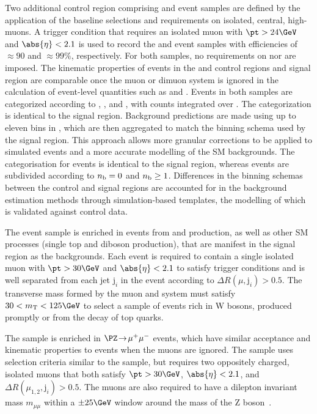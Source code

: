Two additional control region comprising \mj and \mmj event samples
are defined by the application of the baseline selections and
requirements on isolated, central, high-\pt muons. A trigger condition
that requires an isolated muon with $\pt > 24\GeV$ and $\abs{\eta} <
2.1$ is used to record the \mj and \mmj event samples with
efficiencies of ${\approx}90$ and ${\approx}99\%$, respectively. For
both samples, no requirements on \alphat nor \bdphi are imposed. The
kinematic properties of events in the \mj and \mmj control regions and
signal region are comparable once the muon or dimuon system is ignored
in the calculation of event-level quantities such as \scalht and \mht.
Events in both samples are categorized according to \njet, \scalht,
and \nb, with counts integrated over \mht. The \njet categorization is
identical to the signal region. Background predictions are made using
up to eleven bins in \scalht, which are then aggregated to match the
\scalht binning schema used by the signal region. This approach allows
more granular corrections to be applied to simulated events and a more
accurate modelling of the SM backgrounds. The \nb categorisation for
\mj events is identical to the signal region, whereas \mmj events are
subdivided according to $n_{\text{b}} = 0$ and $n_{\text{b}} \geq 1$. Differences in the
binning schemas between the control and signal regions are accounted
for in the background estimation methods through simulation-based
templates, the modelling of which is validated against control data.

The \mj event sample is enriched in events from \wmj and \ttbar
production, as well as other SM processes (\eg single top and diboson
production), that are manifest in the signal region as the \lost
backgrounds. Each event is required to contain a single isolated muon
with $\pt > 30\GeV$ and $\abs{\eta} < 2.1$ to satisfy trigger
conditions and is well separated from each jet $\text{j}_i$ in the
event according to ${\Delta}R(\mu,\text{j}_i) > 0.5$. The transverse
mass formed by the muon \pt and \ptvecmiss system must satisfy $30 <
m_\text{T} < 125\GeV$ to select a sample of events rich in W bosons,
produced promptly or from the decay of top quarks.

The \mmj sample is enriched in $\PZ\! \rightarrow\!  \mu^+\mu^-$
events, which have similar acceptance and kinematic properties to
\znunuj events when the muons are ignored. The sample uses selection
criteria similar to the \mj sample, but requires two oppositely
charged, isolated muons that both satisfy $\pt > 30\GeV$, $\abs{\eta}
< 2.1$, and ${\Delta}R(\mu_{1,2},\text{j}_i) > 0.5$. The muons are
also required to have a dilepton invariant mass $m_{\mu\mu}$ within a
${\pm}25\GeV$ window around the mass of the Z
boson~\cite{1674-1137-38-9-090001}.

